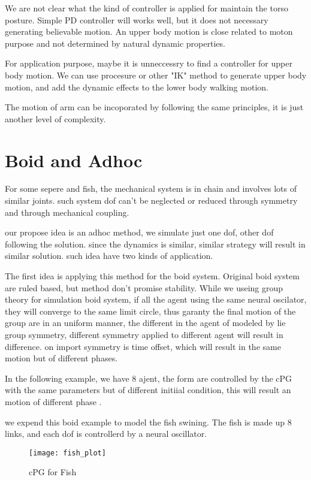 We are not clear what the kind of controller is applied for maintain the torso posture.
Simple PD controller will works well, but it does not necessary generating believable motion.
An upper body motion is close related to moton purpose and not determined by natural dynamic properties.

For application purpose, maybe it is unneccessry to find a controller for upper body motion.
We can use procesure or other "IK" method to generate upper body motion, and add the dynamic effects to the lower body walking motion.

The motion of arm can be incoporated by following the same principles, it is just another level of complexity.


\section{Boid and Adhoc}

For some sepere and fish, the mechanical system is in chain and involves lots of similar joints.
such system dof can't be neglected or reduced through symmetry and through mechanical coupling.

our propose idea is an adhoc method, we simulate just one dof, other dof following the solution.
since the dynamics is similar, similar strategy will result in similar solution.
such idea have two kinds of application.


The first idea is applying this method for the boid system.
Original boid system are ruled based, but method don't promise stability.
While we useing group theory for simulation boid system, if all the agent using the same neural oscilator, they will converge to the same limit circle,
thus garanty the final motion of the group are in an uniform manner, the different in the agent of modeled by lie group symmetry, different symmetry applied to different agent will result in
difference.
on import symmetry is time offset, which will result in the same motion but of different phases.


In the following example, we have 8 ajent,
the form are controlled by the cPG with the same parameters but of different initiial condition,
this will result an motion of different phase .


we expend this boid example to model the fish swining.
The fish is made up 8 links, and each dof is controllerd by a neural oscillator.

\begin{figure}[!htbp]
  \begin{center}
      \texttt{[image: fish\_plot]}
    \caption{cPG for Fish}
    \label{fig:fishplot}
\end{center}
\end{figure}


